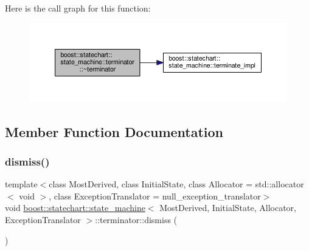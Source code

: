 Here is the call graph for this function\+:
\nopagebreak
\begin{figure}[H]
\begin{center}
\leavevmode
\includegraphics[width=350pt]{classboost_1_1statechart_1_1state__machine_1_1terminator_ab7fb7436ce00c95f86eae04e7680f07f_cgraph}
\end{center}
\end{figure}


\subsection{Member Function Documentation}
\mbox{\label{classboost_1_1statechart_1_1state__machine_1_1terminator_abe1a2391649be5b88968d29e0fd23e87}} 
\subsubsection{\texorpdfstring{dismiss()}{dismiss()}}
{\footnotesize\ttfamily template$<$class Most\+Derived, class Initial\+State, class Allocator = std\+::allocator$<$ void $>$, class Exception\+Translator = null\+\_\+exception\+\_\+translator$>$ \\
void \mbox{\hyperlink{classboost_1_1statechart_1_1state__machine}{boost\+::statechart\+::state\+\_\+machine}}$<$ Most\+Derived, Initial\+State, Allocator, Exception\+Translator $>$\+::terminator\+::dismiss (\begin{DoxyParamCaption}{ }\end{DoxyParamCaption})\hspace{0.3cm}{\ttfamily [inline]}}

\mbox{\label{classboost_1_1statechart_1_1state__machine_1_1terminator_ad2254dfe7c984a14ed5f76deab912551}} 
